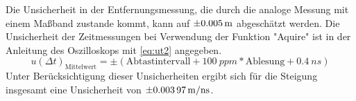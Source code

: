 \documentclass[
	a4paper,
	12pt,
	pagesize,
	ngerman
]{scrartcl}
\begin{document}
Die Unsicherheit in der Entfernungsmessung, die durch die analoge Messung mit einem Maßband zustande kommt, kann auf $\SI{\pm0,005}{m}$ abgeschätzt werden. Die Unsicherheit der Zeitmessungen bei Verwendung der Funktion "Aquire" ist in der Anleitung des Oszilloskops mit \cref{eq:ut2} angegeben.
\begin{equation}
	u(\Delta t)_\text{Mittelwert} = \pm(\text{Abtastintervall} + \SI{100}{ppm} * \text{Ablesung} + \SI{0,4}{ns})
	\label{eq:ut2}
\end{equation}
Unter Berücksichtigung dieser Unsicherheiten ergibt sich für die Steigung insgesamt eine Unsicherheit von $\SI{\pm0,00397}{m/ns}$.
\end{document}
